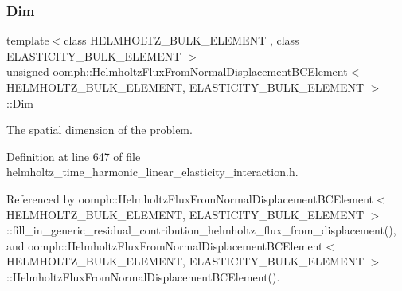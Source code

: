 \subsubsection{\texorpdfstring{Dim}{Dim}}
{\footnotesize\ttfamily template$<$class H\+E\+L\+M\+H\+O\+L\+T\+Z\+\_\+\+B\+U\+L\+K\+\_\+\+E\+L\+E\+M\+E\+NT , class E\+L\+A\+S\+T\+I\+C\+I\+T\+Y\+\_\+\+B\+U\+L\+K\+\_\+\+E\+L\+E\+M\+E\+NT $>$ \\
unsigned \hyperlink{classoomph_1_1HelmholtzFluxFromNormalDisplacementBCElement}{oomph\+::\+Helmholtz\+Flux\+From\+Normal\+Displacement\+B\+C\+Element}$<$ H\+E\+L\+M\+H\+O\+L\+T\+Z\+\_\+\+B\+U\+L\+K\+\_\+\+E\+L\+E\+M\+E\+NT, E\+L\+A\+S\+T\+I\+C\+I\+T\+Y\+\_\+\+B\+U\+L\+K\+\_\+\+E\+L\+E\+M\+E\+NT $>$\+::Dim\hspace{0.3cm}{\ttfamily [private]}}



The spatial dimension of the problem. 



Definition at line 647 of file helmholtz\+\_\+time\+\_\+harmonic\+\_\+linear\+\_\+elasticity\+\_\+interaction.\+h.



Referenced by oomph\+::\+Helmholtz\+Flux\+From\+Normal\+Displacement\+B\+C\+Element$<$ H\+E\+L\+M\+H\+O\+L\+T\+Z\+\_\+\+B\+U\+L\+K\+\_\+\+E\+L\+E\+M\+E\+N\+T, E\+L\+A\+S\+T\+I\+C\+I\+T\+Y\+\_\+\+B\+U\+L\+K\+\_\+\+E\+L\+E\+M\+E\+N\+T $>$\+::fill\+\_\+in\+\_\+generic\+\_\+residual\+\_\+contribution\+\_\+helmholtz\+\_\+flux\+\_\+from\+\_\+displacement(), and oomph\+::\+Helmholtz\+Flux\+From\+Normal\+Displacement\+B\+C\+Element$<$ H\+E\+L\+M\+H\+O\+L\+T\+Z\+\_\+\+B\+U\+L\+K\+\_\+\+E\+L\+E\+M\+E\+N\+T, E\+L\+A\+S\+T\+I\+C\+I\+T\+Y\+\_\+\+B\+U\+L\+K\+\_\+\+E\+L\+E\+M\+E\+N\+T $>$\+::\+Helmholtz\+Flux\+From\+Normal\+Displacement\+B\+C\+Element().

\mbox{\label{classoomph_1_1HelmholtzFluxFromNormalDisplacementBCElement_a84343ef8842d932061e696fdbd032590}} 
